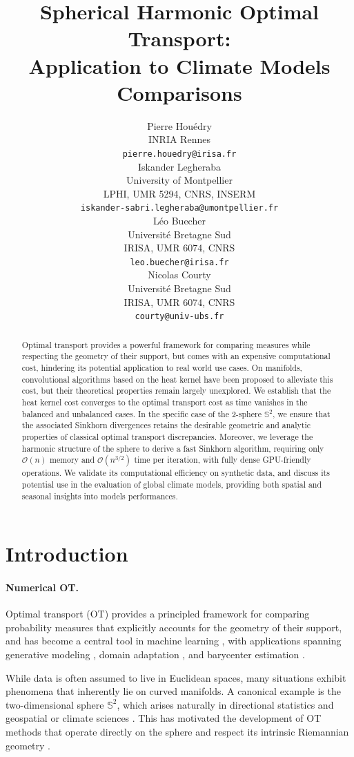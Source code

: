 \documentclass{article}
\title{Spherical Harmonic Optimal Transport: \\Application to Climate Models Comparisons}
\author{%
  Pierre Houédry   \\
  INRIA Rennes \\
  \texttt{pierre.houedry@irisa.fr} \\
  \And %
  Iskander Legheraba \\
  University of Montpellier \\
  LPHI, UMR 5294, CNRS, INSERM\\
  \texttt{iskander-sabri.legheraba@umontpellier.fr} \\
 \AND
  Léo Buecher \\
  Université Bretagne Sud \\
IRISA, UMR 6074, CNRS \\
   \texttt{leo.buecher@irisa.fr} \\
 \And
  Nicolas Courty \\
 Université Bretagne Sud \\
IRISA, UMR 6074, CNRS \\
  \texttt{courty@univ-ubs.fr} \\
}
\theoremstyle{plain}
\theoremstyle{definition}
\theoremstyle{remark}
\begin{document}
\maketitle


\begin{abstract}
Optimal transport provides a powerful framework for comparing measures while respecting the geometry of their support, but comes with an expensive computational cost, hindering its potential application to real world use cases. On manifolds, convolutional algorithms based on the heat kernel have been proposed to alleviate this cost, but their theoretical properties remain largely unexplored. 
We establish that the heat kernel cost converges to the optimal transport cost as time vanishes in the balanced and unbalanced cases.  
In the specific case of the 2-sphere $\mathbb{S}^2$, we ensure that the associated Sinkhorn divergences retains the desirable geometric and analytic properties of classical optimal transport discrepancies. Moreover, we leverage the harmonic structure of the sphere to derive a fast Sinkhorn algorithm, requiring only $\mathcal{O}(n)$ memory and $\mathcal{O}(n^{3/2})$ time per iteration, with fully dense GPU-friendly operations. 
We validate its computational efficiency on synthetic data, and discuss its potential use in the evaluation of global climate models, providing both spatial and seasonal insights into models performances.
\end{abstract}
\section{Introduction}

\paragraph{Numerical OT.}
Optimal transport (OT) provides a principled framework for comparing probability measures that explicitly accounts for the geometry of their support, and has become a central tool in machine learning \cite{villani2009optimal}, with applications spanning generative modeling \cite{arjovskyWassersteinGenerativeAdversarial2017}, domain adaptation \cite{courtyOptimalTransportDomain2017}, and barycenter estimation \cite{cuturi2013sinkhorn, peyre2019computational}.

While data is often assumed to live in Euclidean spaces, many situations exhibit phenomena that inherently lie on curved manifolds. A canonical example is the two-dimensional sphere $\mathbb{S}^2$, which arises naturally in directional statistics \cite{mardia2000directional} and geospatial or climate sciences \cite{garrett2024validating}. This has motivated the development of OT methods that operate directly on the sphere and respect its intrinsic Riemannian geometry \cite{bonetSphericalSlicedWasserstein2022, liuLinearSphericalSliced2024}.
\end{document}
